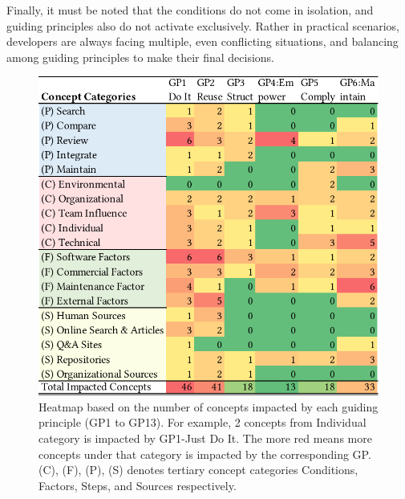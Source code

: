 Finally, it must be noted that the conditions do not come in isolation, and guiding principles also do not activate exclusively. Rather in practical scenarios, developers are always facing multiple, even conflicting situations, and balancing among guiding principles to make their final decisions.

\begin{figure}
    \centering
    \includegraphics[scale=0.7]{images/Concept-Principle-Heatmap.pdf}
    \caption{Heatmap based on the number of concepts impacted by each guiding principle (GP1 to GP13). For example, 2 concepts from Individual category is impacted by GP1-Just Do It. The more red means more concepts under that category is impacted by the corresponding GP. (C), (F), (P), (S) denotes tertiary concept categories Conditions, Factors, Steps, and Sources respectively.}
    \label{fig:Concept-Principle-Heatmap}
\end{figure}



